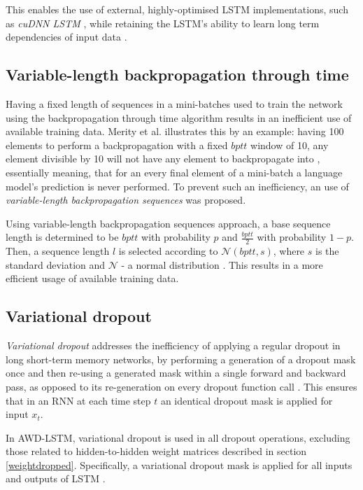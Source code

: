 This enables the use of external, highly-optimised LSTM implementations, such as \emph{cuDNN LSTM} \cite{merity:awdlstm}, while retaining the LSTM's ability to learn long term dependencies of input data \cite{seth:awdlstmgreat}.

\subsection{Variable-length backpropagation through time}
\label{vl:bptt}

Having a fixed length of sequences in a mini-batches used to train the network using the backpropagation through time algorithm results in an inefficient use of available training data. Merity et al. illustrates this by an example: having 100 elements to perform a backpropagation with a fixed $bptt$ window of 10, any element divisible by 10 will not have any element to backpropagate into \cite{merity:awdlstm}, essentially meaning, that for an every final element of a mini-batch a language model's prediction is never performed. To prevent such an inefficiency, an use of \emph{variable-length backpropagation sequences} was proposed. 

Using variable-length backpropagation sequences approach, a base sequence length is determined to be $bptt$ with probability $p$ and $\frac{bptt}{2}$ with probability $1-p$. Then, a sequence length $l$ is selected according to $\mathcal{N}(bptt, s)$, where $s$ is the standard deviation and $\mathcal{N}$ - a normal distribution \cite{seth:awdlstmgreat}. This results in a more efficient usage of available training data.

\subsection{Variational dropout}
\label{variationaldropout}

\emph{Variational dropout} addresses the inefficiency of applying a regular dropout in long short-term memory networks, by performing a generation of a dropout mask once and then re-using a generated mask within a single forward and backward pass, as opposed to its re-generation on every dropout function call . This ensures that in an RNN at each time step $t$ an identical dropout mask is applied for input $x_t$. 

In AWD-LSTM, variational dropout is used in all dropout operations, excluding those related to hidden-to-hidden weight matrices described in section \ref{weightdropped}. Specifically, a variational dropout mask is applied for all inputs and outputs of LSTM \cite{merity:awdlstm}.

